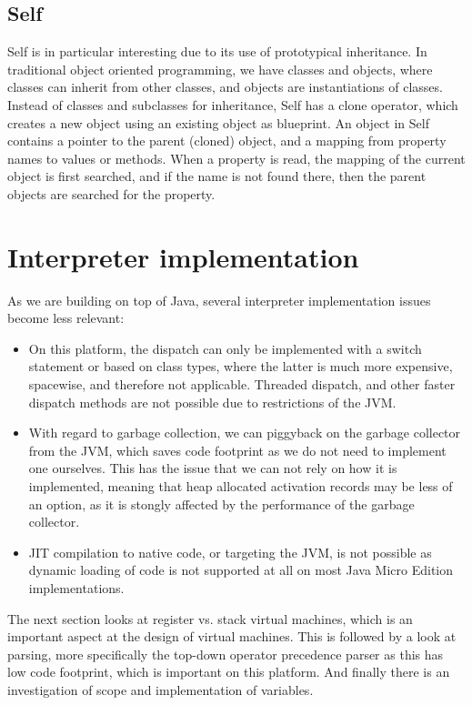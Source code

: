 \documentclass[11pt]{report}
\begin{document}
\subsection{Self}
\label{survey-self}
Self \cite{self} is in particular interesting due to its use of prototypical inheritance.
In traditional object oriented programming, we have classes and objects, where classes can inherit from other classes, and objects are instantiations of classes.
Instead of classes and subclasses for inheritance, Self has a clone operator, which creates a new object using an existing object as blueprint.
An object in Self contains a pointer to the parent (cloned) object, and a mapping from property names to values or methods. When a property is read, the mapping of the current object is first searched, and if the name is not found there, then the parent objects are searched for the property.

\section{Interpreter implementation}
\label{interpreter-implementation}

As we are building on top of Java, 
several interpreter implementation issues
become less relevant:
\begin{itemize}
\item On this platform, the dispatch can only be implemented 
with a switch statement or based on class types, where the
latter is much more expensive, spacewise, and therefore not applicable.
Threaded dispatch, and other faster dispatch methods are not possible
due to restrictions of the JVM.
\item With regard to garbage collection, we can piggyback on the garbage collector from the JVM, which saves code footprint as we do not need to implement one ourselves. This has the issue that we can not rely on how it is implemented, meaning that heap allocated activation records may be less of an option, as it is stongly affected by the performance of the garbage collector.
\item JIT compilation to native code, or targeting the JVM, is not possible as dynamic loading of code is not supported at all on most Java Micro Edition implementations.
\end{itemize}

The next section looks at register vs. stack virtual machines, which is an important aspect at the design of virtual machines. This is followed by a look at parsing, more specifically the top-down operator precedence parser as this has low code footprint, which is important on this platform. And finally there is an investigation of scope and implementation of variables.
\end{document}
